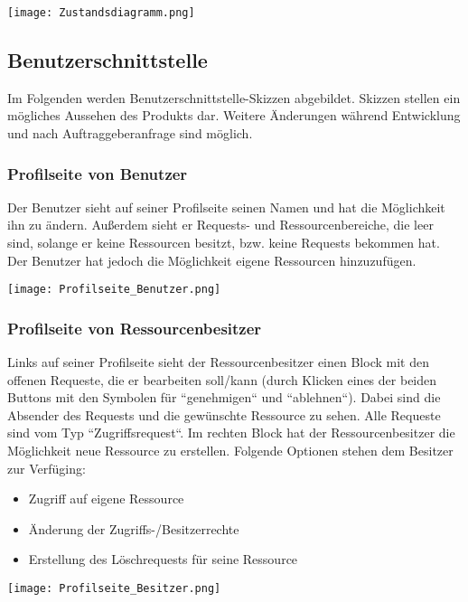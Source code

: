 \documentclass[parskip=full,11pt]{scrartcl}
\begin{document}
	\begin{center}
	\texttt{[image: Zustandsdiagramm.png]}
	\end{center}
	\newpage
\subsection{Benutzerschnittstelle}
Im Folgenden werden Benutzerschnittstelle-Skizzen abgebildet. Skizzen stellen ein mögliches Aussehen des Produkts dar. Weitere Änderungen während Entwicklung und nach Auftraggeberanfrage sind möglich.
\subsubsection*{Profilseite von Benutzer}
Der Benutzer sieht auf seiner Profilseite seinen Namen und hat die Möglichkeit ihn zu ändern. Außerdem sieht er Requests- und Ressourcenbereiche, die leer sind, solange er keine Ressourcen besitzt, bzw. keine Requests bekommen hat. Der Benutzer hat jedoch die Möglichkeit eigene Ressourcen hinzuzufügen.
	\begin{center}
	\texttt{[image: Profilseite\_Benutzer.png]}
	\end{center}
\newpage
\subsubsection*{Profilseite von Ressourcenbesitzer}

Links auf seiner Profilseite sieht der Ressourcenbesitzer einen Block mit den offenen Requeste, die er bearbeiten soll/kann (durch Klicken eines der beiden Buttons mit den Symbolen für ``genehmigen`` und ``ablehnen``). Dabei sind die Absender des Requests und die gewünschte Ressource zu sehen. Alle Requeste sind vom Typ ``Zugriffsrequest``. Im rechten Block hat der Ressourcenbesitzer die Möglichkeit neue Ressource zu erstellen. Folgende Optionen stehen dem Besitzer zur Verfüging:
\begin{itemize}
	\item Zugriff auf eigene Ressource 
	\item Änderung der Zugriffs-/Besitzerrechte 
	\item Erstellung des Löschrequests für seine Ressource
\end{itemize} 

	\begin{center}
	\texttt{[image: Profilseite\_Besitzer.png]}
	\end{center}
\newpage	
\end{document}
